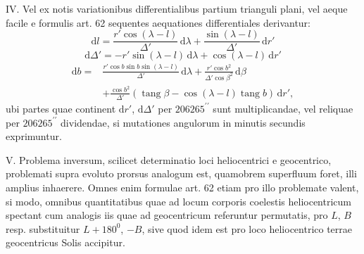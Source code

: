 IV. Vel ex notis variationibus differentialibus partium trianguli plani, vel aeque facile e formulis art. 62 sequentes aequationes differentiales derivantur:
\[
\mathrm{d}l=\frac{r'\cos(\lambda-l)}{\Delta'}\,\mathrm{d}\lambda+\frac{\sin(\lambda-l)}{\Delta'}\,\mathrm{d}r'
\]
\[
\mathrm{d}\Delta'=-r'\sin(\lambda-l)\,\mathrm{d}\lambda+\cos(\lambda-l)\,\mathrm{d}r'
\]
\[
\begin{aligned}
\mathrm{d}b={}&\frac{r'\cos b\sin b\sin(\lambda-l)}{\Delta'}\,\mathrm{d}\lambda
+\frac{r'\cos b^2}{\Delta'\cos\beta^2}\,\mathrm{d}\beta\\
&+\frac{\cos b^2}{\Delta'}(\operatorname{tang}\beta-\cos(\lambda-l)\operatorname{tang}b)\,\mathrm{d}r',
\end{aligned}
\]
\noindent ubi partes quae continent $\mathrm{d}r'$, $\mathrm{d}\Delta'$ per $206265^{\prime\prime}$ sunt multiplicandae, vel reliquae per $206265^{\prime\prime}$ dividendae, si mutationes angulorum in minutis secundis exprimuntur.

V. Problema inversum, scilicet determinatio loci heliocentrici e geocentrico, problemati supra evoluto prorsus analogum est, quamobrem superfluum foret, illi amplius inhaerere. Omnes enim formulae art. 62 etiam pro illo problemate valent, si modo, omnibus quantitatibus quae ad locum corporis coelestis heliocentricum spectant cum analogis iis quae ad geocentricum referuntur permutatis, pro $L$, $B$ resp. substituitur $L+180^0$, $-B$, sive quod idem est pro loco heliocentrico terrae geocentricus Solis accipitur.
